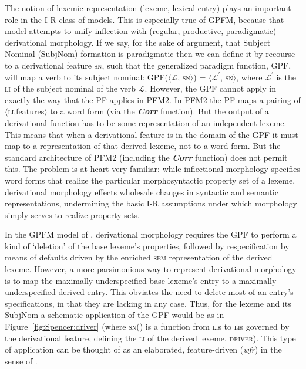 \documentclass[output=paper]{langsci/langscibook}
\begin{document}
The notion of lexemic representation (lexeme, lexical entry) plays an important role in the I-R class of models. This is   especially true of  GPFM, because that model attempts to unify inflection with (regular, productive, paradigmatic) derivational morphology. If we say, for the sake of argument, that  Subject Nominal (SubjNom) formation is paradigmatic then we can define it by recourse to a derivational feature %
\citep[cf.][257]{Stump01:book} %
%
\textsc{sn}, such that the generalized paradigm function, GPF, will map a verb  to its subject nominal: GPF($\langle$$\mathcal{L}$, \textsc{sn}$\rangle$)  = $\langle$$\mathcal{L^{\prime}}$, \textsc{sn}$\rangle$, where $\mathcal{L^{\prime}}$
is the \textsc{li} of the subject nominal of the verb $\mathcal{L}$. However, the GPF cannot apply in exactly the way that the PF applies in PFM2. In PFM2 the PF maps a pairing of $\langle$\textsc{li},features$\rangle$ to a word form (via the \textbf{\textit{Corr}} function). But the output of a derivational function has to be some representation of an independent lexeme. This means that when a derivational feature is in the domain of the GPF it must map to a representation of that derived lexeme, not to a word form. But the standard architecture of PFM2 (including the \textbf{\textit{Corr}} function) does not permit this. The problem is at heart very familiar: while inflectional morphology specifies word forms that realize the particular morphosyntactic property set of a lexeme, derivational morphology effects wholesale changes in syntactic and semantic representations, undermining the basic I-R assumptions under which morphology simply serves to realize property sets.


In the GPFM model of %
\citet{Spencer13}%
%
, derivational morphology requires the GPF to perform a kind of `deletion' of the base lexeme's properties, followed by respecification by means of defaults driven by the enriched \textsc{sem} representation of the derived lexeme. However, a more parsimonious way to represent derivational morphology is to map the maximally underspecified base lexeme's entry to a maximally underspecified derived entry. %
This obviates the need to delete most of an entry's specifications, in that they are lacking in any case.
Thus, for the lexeme  and its SubjNom  a schematic application of the GPF would be as in Figure~\ref{fig:Spencer:driver} (where \textsc{sn}() is a function from \textsc{li}s to \textsc{li}s governed by the derivational feature, defining the \textsc{li} of the derived lexeme, \textsc{driver}). This type of application can be thought of as an elaborated, feature-driven  (\emph{wfr}) in the sense of \citealt{Aronoff1976}.
\end{document}
